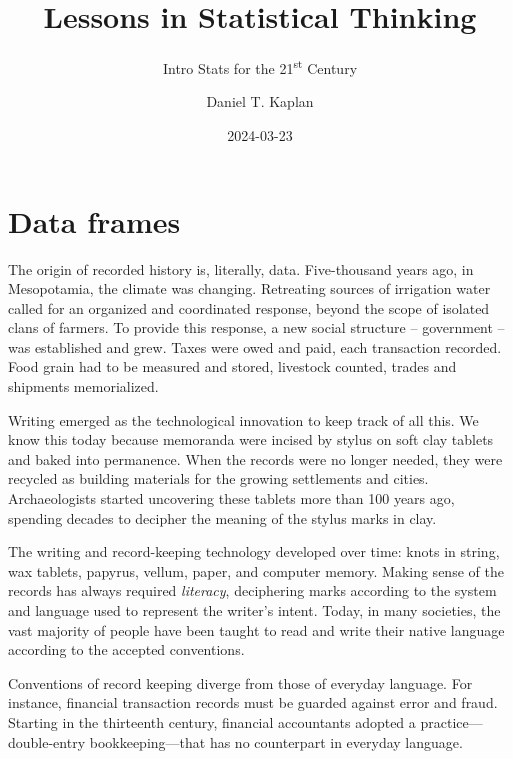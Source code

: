 \documentclass[
  letterpaper,
  DIV=11,
  numbers=noendperiod,
  oneside]{scrartcl}
\title{Lessons in Statistical Thinking}
\subtitle{Intro Stats for the 21\textsuperscript{st} Century}
\author{Daniel T. Kaplan}
\date{2024-03-23}
\renewcommand*\contentsname{Table of contents}
\newcommand\contentsname{Table of contents}
\begin{document}
\maketitle

\renewcommand*\contentsname{Table of contents}
{
\hypersetup{linkcolor=}
\setcounter{tocdepth}{3}
\tableofcontents
}
\newpage

\section{Data frames}\label{sec-data-frames}

The origin of recorded history is, literally, data. Five-thousand years
ago, in Mesopotamia, the climate was changing. Retreating sources of
irrigation water called for an organized and coordinated response,
beyond the scope of isolated clans of farmers. To provide this response,
a new social structure -- government -- was established and grew. Taxes
were owed and paid, each transaction recorded. Food grain had to be
measured and stored, livestock counted, trades and shipments
memorialized.

Writing emerged as the technological innovation to keep track of all
this. We know this today because memoranda were incised by stylus on
soft clay tablets and baked into permanence. When the records were no
longer needed, they were recycled as building materials for the growing
settlements and cities. Archaeologists started uncovering these tablets
more than 100 years ago, spending decades to decipher the meaning of the
stylus marks in clay.

The writing and record-keeping technology developed over time: knots in
string, wax tablets, papyrus, vellum, paper, and computer memory. Making
sense of the records has always required \emph{literacy}, deciphering
marks according to the system and language used to represent the
writer's intent. Today, in many societies, the vast majority of people
have been taught to read and write their native language according to
the accepted conventions.

Conventions of record keeping diverge from those of everyday language.
For instance, financial transaction records must be guarded against
error and fraud. Starting in the thirteenth century, financial
accountants adopted a practice---double-entry bookkeeping---that has no
counterpart in everyday language.
{}
\end{document}

